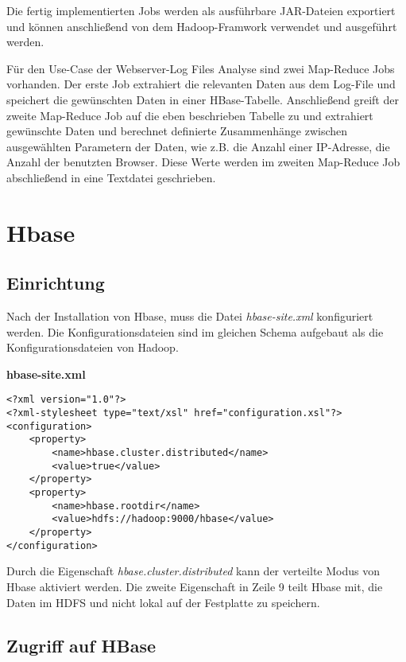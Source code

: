 Die fertig implementierten Jobs werden als ausführbare JAR-Dateien exportiert und können anschließend von dem Hadoop-Framwork verwendet und ausgeführt werden.

Für den Use-Case der Webserver-Log Files Analyse sind zwei Map-Reduce Jobs vorhanden. Der erste Job extrahiert die relevanten Daten aus dem Log-File und speichert die gewünschten Daten in einer HBase-Tabelle. Anschließend greift der zweite Map-Reduce Job auf die eben beschrieben Tabelle zu und extrahiert gewünschte Daten und berechnet definierte Zusammenhänge zwischen ausgewählten Parametern der Daten, wie z.B. die Anzahl einer IP-Adresse, die Anzahl der benutzten Browser. Diese Werte werden im zweiten Map-Reduce Job abschließend in eine Textdatei geschrieben.

\pagebreak

\section{Hbase}
\label{sec:Hbase}

\subsection{Einrichtung}
\label{subsec:EinrichtungHbase}

Nach der Installation von Hbase, muss die Datei \textit{hbase-site.xml} konfiguriert werden. Die Konfigurationsdateien sind im gleichen Schema aufgebaut als die Konfigurationsdateien von Hadoop.

\textbf{hbase-site.xml}

\lstset{language=XML}
\begin{lstlisting}
<?xml version="1.0"?>
<?xml-stylesheet type="text/xsl" href="configuration.xsl"?>
<configuration>
	<property>
		<name>hbase.cluster.distributed</name>
		<value>true</value>
	</property>
	<property>
		<name>hbase.rootdir</name>
		<value>hdfs://hadoop:9000/hbase</value>
	</property>
</configuration>
\end{lstlisting}

Durch die Eigenschaft \textit{hbase.cluster.distributed} kann der verteilte Modus von Hbase aktiviert werden. Die zweite Eigenschaft in Zeile 9 teilt Hbase mit, die Daten im HDFS und nicht lokal auf der Festplatte zu speichern.

\subsection{Zugriff auf HBase}
\label{subsec: HbaseZugriff}

